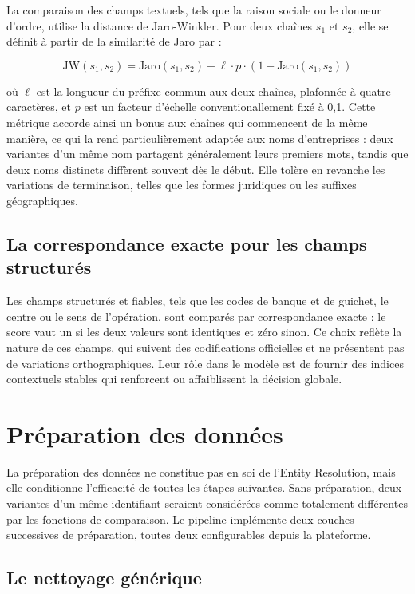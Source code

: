 La comparaison des champs textuels, tels que la raison sociale ou le donneur d'ordre, utilise la distance de Jaro-Winkler. Pour deux chaînes $s_1$ et $s_2$, elle se définit à partir de la similarité de Jaro par :

\[
\text{JW}(s_1, s_2) = \text{Jaro}(s_1, s_2) + \ell \cdot p \cdot (1 - \text{Jaro}(s_1, s_2))
\]

où $\ell$ est la longueur du préfixe commun aux deux chaînes, plafonnée à quatre caractères, et $p$ est un facteur d'échelle conventionallement fixé à 0,1. Cette métrique accorde ainsi un bonus aux chaînes qui commencent de la même manière, ce qui la rend particulièrement adaptée aux noms d'entreprises : deux variantes d'un même nom partagent généralement leurs premiers mots, tandis que deux noms distincts diffèrent souvent dès le début. Elle tolère en revanche les variations de terminaison, telles que les formes juridiques ou les suffixes géographiques.

\subsection{La correspondance exacte pour les champs structurés}

Les champs structurés et fiables, tels que les codes de banque et de guichet, le centre ou le sens de l'opération, sont comparés par correspondance exacte : le score vaut un si les deux valeurs sont identiques et zéro sinon. Ce choix reflète la nature de ces champs, qui suivent des codifications officielles et ne présentent pas de variations orthographiques. Leur rôle dans le modèle est de fournir des indices contextuels stables qui renforcent ou affaiblissent la décision globale.

\section{Préparation des données}

La préparation des données ne constitue pas en soi de l'Entity Resolution, mais elle conditionne l'efficacité de toutes les étapes suivantes. Sans préparation, deux variantes d'un même identifiant seraient considérées comme totalement différentes par les fonctions de comparaison. Le pipeline implémente deux couches successives de préparation, toutes deux configurables depuis la plateforme.

\subsection{Le nettoyage générique}


